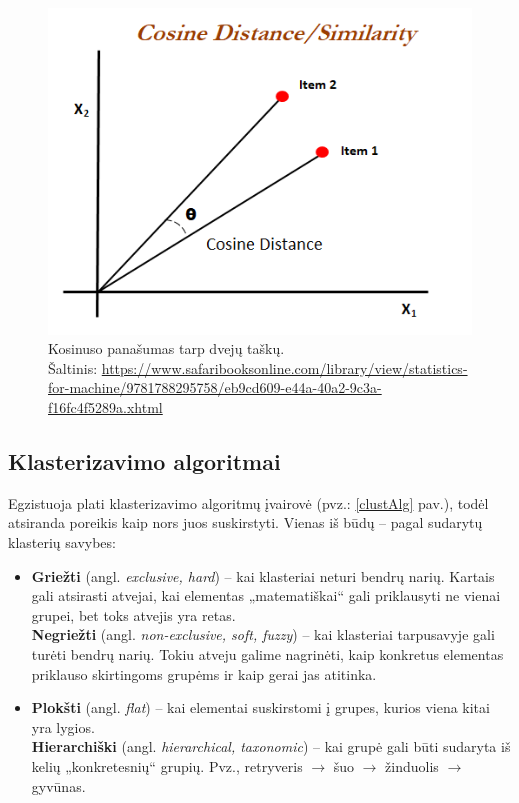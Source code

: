 \documentclass{VUMIFInfKursinis}
\newcommand{\ltang}[2]{#1 (angl. \textit{#2})}
\begin{document}
\begin{figure}[H]
  \centering
  \includegraphics[scale=.5]{img/cos}
  \caption{Kosinuso panašumas tarp dvejų taškų.\\
           Šaltinis: \url{https://www.safaribooksonline.com/library/view/statistics-for-machine/9781788295758/eb9cd609-e44a-40a2-9c3a-f16fc4f5289a.xhtml}}
\end{figure}






\subsection{Klasterizavimo algoritmai}

Egzistuoja plati klasterizavimo algoritmų įvairovė (pvz.: \ref{clustAlg} pav.), todėl atsiranda
poreikis kaip nors juos suskirstyti. Vienas iš būdų – pagal sudarytų
klasterių savybes:

\begin{itemize}
\item
  \ltang{\textbf{Griežti}}{exclusive, hard} – kai klasteriai
  neturi bendrų narių. Kartais gali atsirasti atvejai, kai elementas
  „matematiškai“ gali priklausyti ne vienai grupei, bet toks atvejis
  yra retas.\\
  \ltang{\textbf{Negriežti}}{non-exclusive, soft, fuzzy} – kai
  klasteriai tarpusavyje gali turėti bendrų narių. Tokiu atveju galime
  nagrinėti, kaip konkretus elementas priklauso skirtingoms grupėms ir
  kaip gerai jas atitinka.
\item
  \ltang{\textbf{Plokšti}}{flat} – kai elementai suskirstomi į
  grupes, kurios viena kitai yra lygios.\\
  \ltang{\textbf{Hierarchiški}}{hierarchical, taxonomic} – kai
  grupė gali būti sudaryta iš kelių „konkretesnių“ grupių. Pvz.,
  retryveris $\to$ šuo $\to$ žinduolis $\to$ gyvūnas.
\end{itemize}
\end{document}
